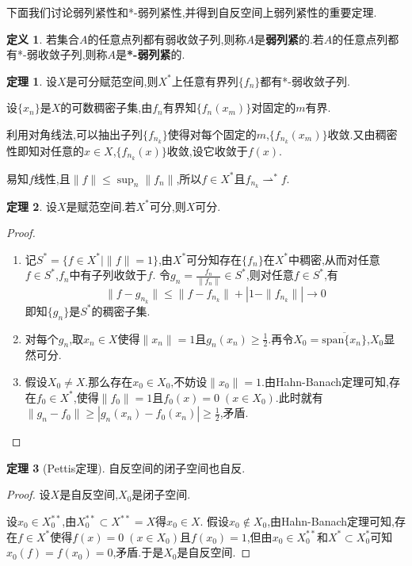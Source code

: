 \documentclass{ctexart}
\theoremstyle{definition}
\newtheorem{definition}{定义}
\newtheorem{theorem}{定理}
\theoremstyle{remark}
\newenvironment{proofsketch}{
  \renewcommand{\proofname}{证明概要}\proof}{\endproof}
\begin{document}
	下面我们讨论弱列紧性和*-弱列紧性,并得到自反空间上弱列紧性的重要定理.
	\begin{definition}
		若集合$A$的任意点列都有弱收敛子列,则称$A$是\textbf{弱列紧}的.若$A$的任意点列都有*-弱收敛子列,则称$A$是\textbf{*-弱列紧}的.
	\end{definition}
	\begin{theorem}
		设$X$是可分赋范空间,则$X^*$上任意有界列$\{f_n\}$都有*-弱收敛子列.
	\end{theorem}
	\begin{proofsketch}
		设$\{x_n\}$是$X$的可数稠密子集,由$f_n$有界知$\{f_n(x_m)\}$对固定的$m$有界.
		
		利用对角线法,可以抽出子列$\{f_{n_k}\}$使得对每个固定的$m$,$\{f_{n_k}(x_m)\}$收敛.又由稠密性即知对任意的$x\in X$,$\{f_{n_k}(x)\}$收敛,设它收敛于$f(x)$.
		
		易知$f$线性,且$\|f\|\le\sup_n{\|f_n\|}$,所以$f\in X^*$且$f_{n_k}\rightharpoonup^* f$.
	\end{proofsketch}
	\begin{theorem}\label{theorem-sperable-space}
		设$X$是赋范空间.若$X^*$可分,则$X$可分.
	\end{theorem}
	\begin{proof}
		\begin{enumerate}
			\item 记$S^*=\{f\in X^*\mid\|f\|=1\}$,由$X^*$可分知存在$\{f_n\}$在$X^*$中稠密,从而对任意$f\in S^*$,$f_n$中有子列收敛于$f$.
			令$g_n=\frac{f_n}{\|f_n\|}\in S^*$,则对任意$f\in S^*$,有
			$$\|f-g_{n_k}\|\le\|f-f_{n_k}\|+\left|1-\|f_{n_k}\|\right|\to 0$$
			即知$\{g_n\}$是$S^*$的稠密子集.
			
			\item 对每个$g_n$,取$x_n\in X$使得$\|x_n\|=1$且$g_n(x_n)\ge\frac{1}{2}$.再令$X_0=\overline{\mathrm{span}\{x_n\}}$,$X_0$显然可分.
			
			\item 假设$X_0\ne X$.那么存在$x_0\in X_0$,不妨设$\|x_0\|=1$.由Hahn-Banach定理可知,存在$f_0\in X^*$,使得$\|f_0\|=1$且$f_0(x)=0\;(x\in X_0)$.此时就有$\|g_n-f_0\|\ge|g_n(x_n)-f_0(x_n)|\ge\frac{1}{2}$,矛盾.
		\end{enumerate}
	\end{proof}
	\begin{theorem}[Pettis定理]
		自反空间的闭子空间也自反.
	\end{theorem}
	\begin{proof}
		设$X$是自反空间,$X_0$是闭子空间.
		
		设$x_0\in X_0^{**}$,由$X_0^{**}\subset X^{**}=X$得$x_0\in X$.
		假设$x_0\notin X_0$,由Hahn-Banach定理可知,存在$f\in X^*$使得$f(x)=0\;(x\in X_0)$且$f(x_0)=1$,但由$x_0\in X_0^{**}$和$X^*\subset X_0^*$可知$x_0(f)=f(x_0)=0$,矛盾.于是$X_0$是自反空间.
	\end{proof}
\end{document}
